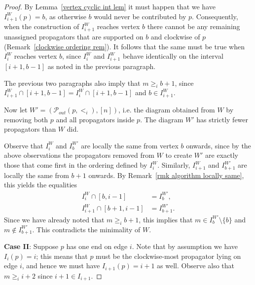 \documentclass[11pt]{article}
\newcommand{\sanote}{\todo[color=violet!30]}
\newcommand{\cP}{\mathcal{P}}
\theoremstyle{remark}
\theoremstyle{definition}
\begin{document}
\begin{proof}
By Lemma~\ref{vertex cyclic int lem} it must happen that we have $I_{i+1}^W(p) = b$, as otherwise $b$ would never be contributed by $p$.  Consequently, when the construction of $I_{i+1}^W$ reaches vertex $b$ there cannot be any remaining unassigned propagators that are supported on $b$ and clockwise of $p$ (Remark~\ref{clockwise ordering rem}). It follows that the same must be true when $I_i^W$ reaches vertex $b$, since $I_i^W$ and $I_{i+1}^W$ behave identically on the interval $[i+1,b-1]$ as noted in the previous paragraph. 

The previous two paragraphs also imply that $m \geq_i b+1$, since $I_{i+1}^W \cap [i+1,b-1] = I_{i}^W \cap [i+1,b-1]$ and $b \in I_{i+1}^W$.


Now let $W' = (\cP_{out}(p,<_i), [n])$, i.e. the diagram obtained from $W$ by removing both $p$ and all propagators inside $p$. The diagram $W'$ has strictly fewer propagators than $W$ did.

Observe that $I_i^W$ and $I_b^{W'}$ are locally the same from vertex $b$ onwards, since by the above observations the propagators removed from $W$ to create $W'$ are exactly those that come first in the ordering defined by $I_i^W$. Similarly, $I_{i+1}^W$ and $I_{b+1}^{W'}$ are locally the same from $b+1$ onwards. By Remark~\ref{rmk algorithm locally same}, this yields the equalities
\begin{align*}
  I_i^{W} \cap [b,i-1] & = I_b^{W'}, \\
  I_{i+1}^{W} \cap [b+1,i-1] & = I_{b+1}^{W'}.
\end{align*} 
Since we have already noted that $m \geq_i b+1$, this implies that $m\in I_b^{W'}\setminus\{b\}$ and $m\not\in I_{b+1}^{W'}$. This contradicts the minimality of $W$.

\textbf{Case II}: Suppose $p$ has one end on edge $i$.  Note that by assumption we have $I_i(p) = i$; this means that $p$ must be the clockwise-most propagator lying on edge $i$, and hence we must have $I_{i+1}(p) = i+1$ as well.  Observe also that $m\geq_i i+2$ since $i+1\in I_{i+1}$.


\end{proof}
\end{document}
